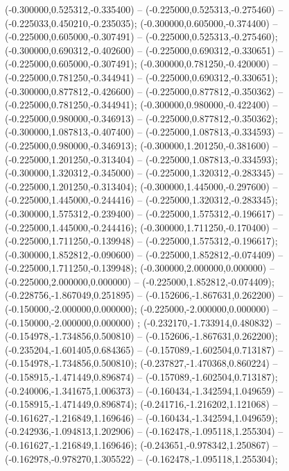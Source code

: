  (-0.300000,0.525312,-0.335400) -- (-0.225000,0.525313,-0.275460) -- (-0.225033,0.450210,-0.235035);
 (-0.300000,0.605000,-0.374400) -- (-0.225000,0.605000,-0.307491) -- (-0.225000,0.525313,-0.275460);
 (-0.300000,0.690312,-0.402600) -- (-0.225000,0.690312,-0.330651) -- (-0.225000,0.605000,-0.307491);
 (-0.300000,0.781250,-0.420000) -- (-0.225000,0.781250,-0.344941) -- (-0.225000,0.690312,-0.330651);
 (-0.300000,0.877812,-0.426600) -- (-0.225000,0.877812,-0.350362) -- (-0.225000,0.781250,-0.344941);
 (-0.300000,0.980000,-0.422400) -- (-0.225000,0.980000,-0.346913) -- (-0.225000,0.877812,-0.350362);
 (-0.300000,1.087813,-0.407400) -- (-0.225000,1.087813,-0.334593) -- (-0.225000,0.980000,-0.346913);
 (-0.300000,1.201250,-0.381600) -- (-0.225000,1.201250,-0.313404) -- (-0.225000,1.087813,-0.334593);
 (-0.300000,1.320312,-0.345000) -- (-0.225000,1.320312,-0.283345) -- (-0.225000,1.201250,-0.313404);
 (-0.300000,1.445000,-0.297600) -- (-0.225000,1.445000,-0.244416) -- (-0.225000,1.320312,-0.283345);
 (-0.300000,1.575312,-0.239400) -- (-0.225000,1.575312,-0.196617) -- (-0.225000,1.445000,-0.244416);
 (-0.300000,1.711250,-0.170400) -- (-0.225000,1.711250,-0.139948) -- (-0.225000,1.575312,-0.196617);
 (-0.300000,1.852812,-0.090600) -- (-0.225000,1.852812,-0.074409) -- (-0.225000,1.711250,-0.139948);
 (-0.300000,2.000000,0.000000) -- (-0.225000,2.000000,0.000000) -- (-0.225000,1.852812,-0.074409);
 (-0.228756,-1.867049,0.251895) -- (-0.152606,-1.867631,0.262200) -- (-0.150000,-2.000000,0.000000);
 (-0.225000,-2.000000,0.000000) -- (-0.150000,-2.000000,0.000000) ;
 (-0.232170,-1.733914,0.480832) -- (-0.154978,-1.734856,0.500810) -- (-0.152606,-1.867631,0.262200);
 (-0.235204,-1.601405,0.684365) -- (-0.157089,-1.602504,0.713187) -- (-0.154978,-1.734856,0.500810);
 (-0.237827,-1.470368,0.860224) -- (-0.158915,-1.471449,0.896874) -- (-0.157089,-1.602504,0.713187);
 (-0.240006,-1.341675,1.006373) -- (-0.160434,-1.342594,1.049659) -- (-0.158915,-1.471449,0.896874);
 (-0.241716,-1.216202,1.121068) -- (-0.161627,-1.216849,1.169646) -- (-0.160434,-1.342594,1.049659);
 (-0.242936,-1.094813,1.202906) -- (-0.162478,-1.095118,1.255304) -- (-0.161627,-1.216849,1.169646);
 (-0.243651,-0.978342,1.250867) -- (-0.162978,-0.978270,1.305522) -- (-0.162478,-1.095118,1.255304);
